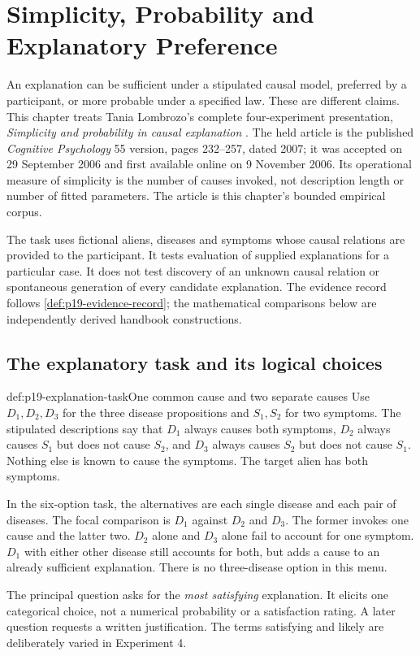 \chapter{Simplicity, Probability and Explanatory Preference}
\label{sec:p19-explanatory-preferences}

An explanation can be sufficient under a stipulated causal model,
preferred by a participant, or more probable under a specified law.
These are different claims. This chapter treats Tania Lombrozo's
complete four-experiment presentation, \emph{Simplicity and probability
in causal explanation} \cite{Lombrozo2007SimplicityProbability}.
The held article is the published \emph{Cognitive Psychology} 55
version, pages 232--257, dated 2007; it was accepted on 29 September
2006 and first available online on 9 November 2006.
Its operational measure of simplicity is the number of causes
invoked, not description length or number of fitted parameters.
The article is this chapter's bounded empirical corpus.

The task uses fictional aliens, diseases and symptoms whose causal
relations are provided to the participant. It tests evaluation of
supplied explanations for a particular case. It does not test discovery
of an unknown causal relation or spontaneous generation of every
candidate explanation. The evidence record follows
\cref{def:p19-evidence-record}; the mathematical comparisons below
are independently derived handbook constructions.

\section{The explanatory task and its logical choices}
\label{sec:p19-explanation-task}

\begin{hbdefinition}{def:p19-explanation-task}{One common cause and two separate causes}
Use \(D_1,D_2,D_3\) for the three disease propositions and
\(S_1,S_2\) for two symptoms. The stipulated descriptions say that
\(D_1\) always causes both symptoms, \(D_2\) always causes \(S_1\)
but does not cause \(S_2\), and \(D_3\) always causes \(S_2\)
but does not cause \(S_1\). Nothing else is known to cause the
symptoms. The target alien has both symptoms.

In the six-option task, the alternatives are each single disease
and each pair of diseases. The focal comparison is \(D_1\)
against \(D_2\) and \(D_3\). The former invokes one cause and
the latter two. \(D_2\) alone and \(D_3\) alone fail to account
for one symptom. \(D_1\) with either other disease still accounts
for both, but adds a cause to an already sufficient explanation.
There is no three-disease option in this menu.

The principal question asks for the \emph{most satisfying}
explanation. It elicits one categorical choice, not a numerical
probability or a satisfaction rating. A later question requests
a written justification. The terms satisfying and likely are
deliberately varied in Experiment 4.
\end{hbdefinition}


